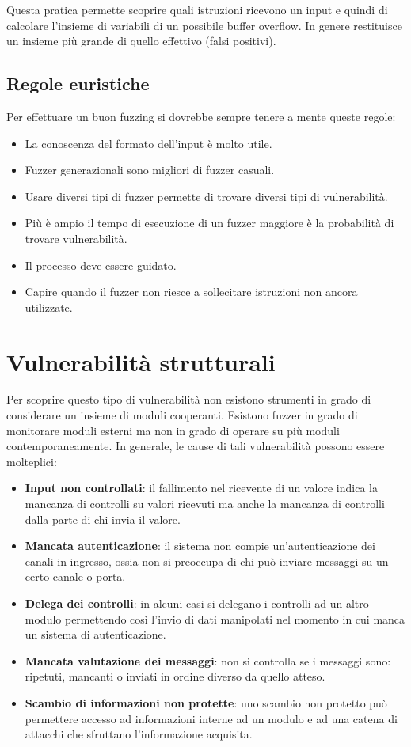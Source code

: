 Questa pratica permette scoprire quali istruzioni ricevono un input e quindi di calcolare l'insieme di variabili di
un possibile buffer overflow. In genere restituisce un insieme più grande di quello effettivo (falsi positivi).

\subsection{Regole euristiche}
Per effettuare un buon fuzzing si dovrebbe sempre tenere a mente queste regole:
\begin{itemize}
	\item La conoscenza del formato dell'input è molto utile.
	\item Fuzzer generazionali sono migliori di fuzzer casuali.
	\item Usare diversi tipi di fuzzer permette di trovare diversi tipi di vulnerabilità.
	\item Più è ampio il tempo di esecuzione di un fuzzer maggiore è la probabilità di trovare vulnerabilità.
	\item Il processo deve essere guidato.
	\item Capire quando il fuzzer non riesce a sollecitare istruzioni non ancora utilizzate.
\end{itemize}

\section{Vulnerabilità strutturali}
Per scoprire questo tipo di vulnerabilità non esistono strumenti in grado di considerare un insieme di moduli
cooperanti. Esistono fuzzer in grado di monitorare moduli esterni ma non in grado di operare su più moduli
contemporaneamente. In generale, le cause di tali vulnerabilità possono essere molteplici:
\begin{itemize}
	\item \textbf{Input non controllati}: il fallimento nel ricevente di un valore indica la mancanza di controlli su
	      valori ricevuti ma anche la mancanza di controlli dalla parte di chi invia il valore.
	\item \textbf{Mancata autenticazione}: il sistema non compie un'autenticazione dei canali in ingresso, ossia non
	      si preoccupa di chi può inviare messaggi su un certo canale o porta.
	\item \textbf{Delega dei controlli}: in alcuni casi si delegano i controlli ad un altro modulo permettendo così
	      l'invio di dati manipolati nel momento in cui manca un sistema di autenticazione.
	\item \textbf{Mancata valutazione dei messaggi}: non si controlla se i messaggi sono: ripetuti, mancanti o inviati
	      in ordine diverso da quello atteso.
	\item \textbf{Scambio di informazioni non protette}: uno scambio non protetto può permettere accesso ad informazioni
	      interne ad un modulo e ad una catena di attacchi che sfruttano l'informazione acquisita.
\end{itemize}
